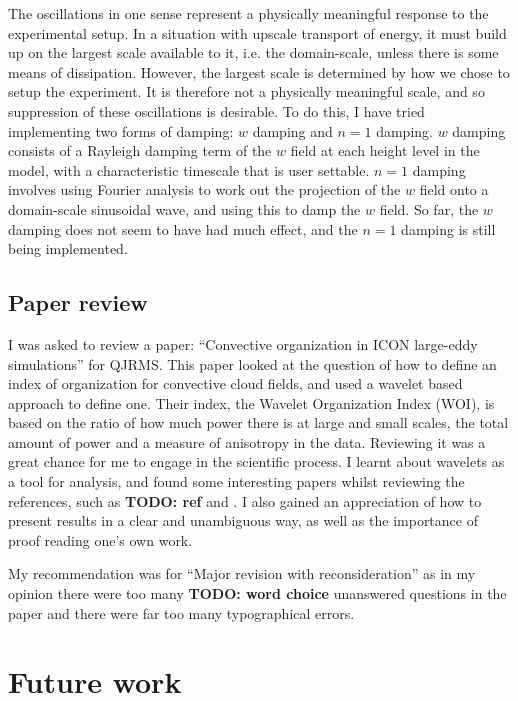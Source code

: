 \documentclass[11pt,a4paper]{article}
\newcommand\todo[1]{\textbf{TODO: #1}}
\begin{document}
The oscillations in one sense represent a physically meaningful response to the experimental setup. In a situation with upscale transport of energy, it must build up on the largest scale available to it, i.e. the domain-scale, unless there is some means of dissipation. However, the largest scale is determined by how we chose to setup the experiment. It is therefore not a physically meaningful scale, and so suppression of these oscillations is desirable. To do this, I have tried implementing two forms of damping: $w$ damping and $n = 1$ damping. $w$ damping consists of a Rayleigh damping term of the $w$ field at each height level in the model, with a characteristic timescale that is user settable. $n = 1$ damping involves using Fourier analysis to work out the projection of the $w$ field onto a domain-scale sinusoidal wave, and using this to damp the $w$ field. So far, the $w$ damping does not seem to have had much effect, and the $n = 1$ damping is still being implemented.

\subsection{Paper review}
I was asked to review a paper: ``Convective organization in ICON large-eddy simulations'' for QJRMS. This paper looked at the question of how to define an index of organization for convective cloud fields, and used a wavelet based approach to define one. Their index, the Wavelet Organization Index (WOI), is based on the ratio of how much power there is at large and small scales, the total amount of power and a measure of anisotropy in the data. Reviewing it was a great chance for me to engage in the scientific process. I learnt about wavelets as a tool for analysis, and found some interesting papers whilst reviewing the references, such as \todo{ref} \cite{weniger2017} and \cite{wong2016}. I also gained an appreciation of how to present results in a clear and unambiguous way, as well as the importance of proof reading one's own work. 

My recommendation was for ``Major revision with reconsideration'' as in my opinion there were too many \todo{word choice} unanswered questions in the paper and there were far too many typographical errors.

\section{Future work}
\label{sec:Future work}
\end{document}
